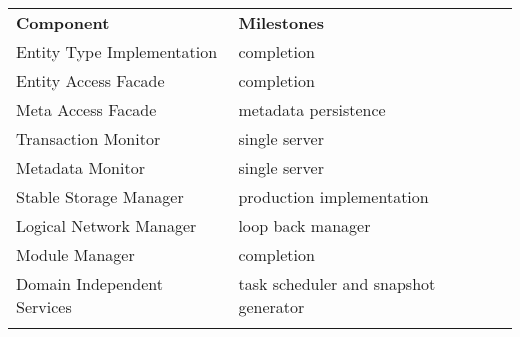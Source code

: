 \documentclass[a4paper, 10pt]{book}
\begin{document}
                                        \begin{center}\begin{footnotesize}\begin{tabular}{||l|l||} \hhline{|t:==:t|}
                                            \textbf{Component}          & \textbf{Milestones}                            %
                                            \\ \hhline{|:==:|} 
                                            Entity Type Implementation  & completion                                     %
                                            \\ \hhline{||--||}
                                            Entity Access Facade        & completion                                     %
                                            \\ \hhline{||--||}
                                            Meta Access Facade          & metadata persistence                           %
                                            \\ \hhline{||--||}
                                            Transaction Monitor         & single server                                  %
                                            \\ \hhline{||--||}
                                            Metadata Monitor            & single server                                  %
                                            \\ \hhline{||--||}
                                            Stable Storage Manager      & production implementation              %
                                            \\ \hhline{||--||}
                                            Logical Network Manager     & loop back manager                              %
                                            \\ \hhline{||--||}
                                            Module Manager              & completion                                       %
                                            \\ \hhline{||--||}
                                            Domain Independent Services & task scheduler and snapshot generator  %
                                            \\ \hhline{|b:==:b|}
                                        \end{tabular}\end{footnotesize}\end{center}
\end{document}
